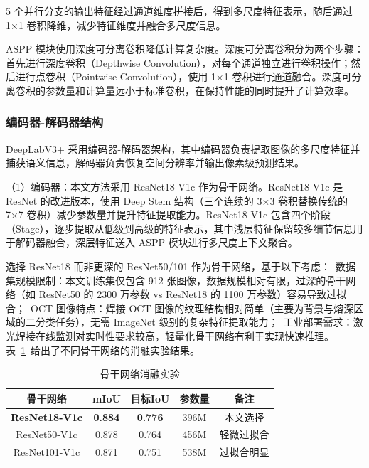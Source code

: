 5 个并行分支的输出特征经过通道维度拼接后，得到多尺度特征表示，随后通过 1×1 卷积降维，减少特征维度并融合多尺度信息。

ASPP 模块使用深度可分离卷积降低计算复杂度。深度可分离卷积分为两个步骤：首先进行深度卷积（Depthwise Convolution），对每个通道独立进行卷积操作；然后进行点卷积（Pointwise Convolution），使用 1×1 卷积进行通道融合。深度可分离卷积的参数量和计算量远小于标准卷积，在保持性能的同时提升了计算效率。

\subsubsection{编码器-解码器结构}

DeepLabV3+ 采用编码器-解码器架构，其中编码器负责提取图像的多尺度特征并捕获语义信息，解码器负责恢复空间分辨率并输出像素级预测结果。

（1）编码器：本文方法采用 ResNet18-V1c 作为骨干网络。ResNet18-V1c 是 ResNet 的改进版本，使用 Deep Stem 结构（三个连续的 3×3 卷积替换传统的 7×7 卷积）减少参数量并提升特征提取能力。ResNet18-V1c 包含四个阶段（Stage），逐步提取从低级到高级的特征表示，其中浅层特征保留较多细节信息用于解码器融合，深层特征送入 ASPP 模块进行多尺度上下文聚合。

选择 ResNet18 而非更深的 ResNet50/101 作为骨干网络，基于以下考虑：~数据集规模限制：本文训练集仅包含 912 张图像，数据规模相对有限，过深的骨干网络（如 ResNet50 的 2300 万参数 vs ResNet18 的 1100 万参数）容易导致过拟合；~OCT 图像特点：焊接 OCT 图像的纹理结构相对简单（主要为背景与熔深区域的二分类任务），无需 ImageNet 级别的复杂特征提取能力；~工业部署需求：激光焊接在线监测对实时性要求较高，轻量化骨干网络有利于实现快速推理。表~\ref{tab:backbone_comparison}~给出了不同骨干网络的消融实验结果。

\begin{table}[htbp]
\centering
\caption{骨干网络消融实验}
\label{tab:backbone_comparison}
\begin{tabular}{ccccc}
\toprule
骨干网络 & mIoU & 目标IoU & 参数量 & 备注 \\
\midrule
\textbf{ResNet18-V1c} & \textbf{0.884} & \textbf{0.776} & 396M & 本文选择 \\
ResNet50-V1c & 0.878 & 0.764 & 456M & 轻微过拟合 \\
ResNet101-V1c & 0.871 & 0.751 & 538M & 过拟合明显 \\
\bottomrule
\end{tabular}
\end{table}

